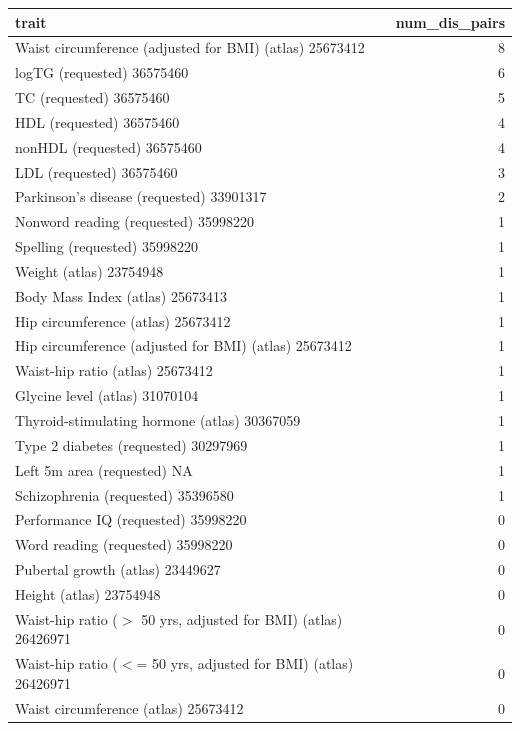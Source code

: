 \begin{table}[ht]
\centering
\begin{tabular}{lr}
  \hline
trait & num\_dis\_pairs \\ 
  \hline
Waist circumference (adjusted for BMI) (atlas) 25673412 &   8 \\ 
  logTG (requested) 36575460 &   6 \\ 
  TC (requested) 36575460 &   5 \\ 
  HDL (requested) 36575460 &   4 \\ 
  nonHDL (requested) 36575460 &   4 \\ 
  LDL (requested) 36575460 &   3 \\ 
  Parkinson's disease (requested) 33901317 &   2 \\ 
  Nonword reading (requested) 35998220 &   1 \\ 
  Spelling (requested) 35998220 &   1 \\ 
  Weight  (atlas) 23754948 &   1 \\ 
  Body Mass Index  (atlas) 25673413 &   1 \\ 
  Hip circumference  (atlas) 25673412 &   1 \\ 
  Hip circumference (adjusted for BMI) (atlas) 25673412 &   1 \\ 
  Waist-hip ratio  (atlas) 25673412 &   1 \\ 
  Glycine level  (atlas) 31070104 &   1 \\ 
  Thyroid-stimulating hormone  (atlas) 30367059 &   1 \\ 
  Type 2 diabetes (requested) 30297969 &   1 \\ 
  Left 5m area (requested) NA &   1 \\ 
  Schizophrenia (requested) 35396580 &   1 \\ 
  Performance IQ (requested) 35998220 &   0 \\ 
  Word reading (requested) 35998220 &   0 \\ 
  Pubertal growth  (atlas) 23449627 &   0 \\ 
  Height  (atlas) 23754948 &   0 \\ 
  Waist-hip ratio ($>$ 50 yrs, adjusted for BMI) (atlas) 26426971 &   0 \\ 
  Waist-hip ratio ($<$= 50 yrs, adjusted for BMI) (atlas) 26426971 &   0 \\ 
  Waist circumference  (atlas) 25673412 &   0 \\ 

\end{tabular}
\end{table}

